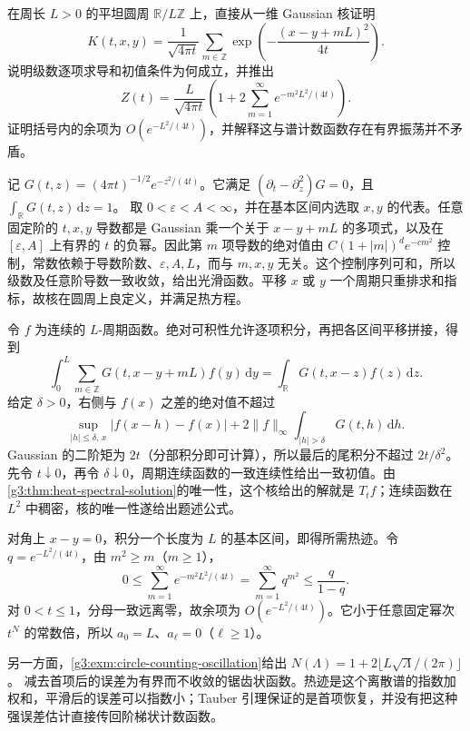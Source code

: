\begin{exercise}\label{g3:ex:circle-periodized-heat-trace}
	在周长 \(L>0\) 的平坦圆周 \(\mathbb R/L\mathbb Z\) 上，直接从一维 Gaussian 核证明
	\[
		K(t,x,y)=\frac1{\sqrt{4\pi t}}
		\sum_{m\in\mathbb Z}
		\exp\left(-\frac{(x-y+mL)^2}{4t}\right).
	\]
	说明级数逐项求导和初值条件为何成立，并推出
	\[
		Z(t)=\frac L{\sqrt{4\pi t}}
		\left(1+2\sum_{m=1}^{\infty}e^{-m^2L^2/(4t)}\right).
	\]
	证明括号内的余项为 \(O(e^{-L^2/(4t)})\)，并解释这与谱计数函数存在有界振荡并不矛盾。
\end{exercise}
\begin{solution}
	记 \(G(t,z)=(4\pi t)^{-1/2}e^{-z^2/(4t)}\)。它满足
	\((\partial_t-\partial_z^2)G=0\)，且
	\(\int_{\mathbb R}G(t,z)\,\mathrm dz=1\)。
	取 \(0<\varepsilon<A<\infty\)，并在基本区间内选取 \(x,y\) 的代表。任意固定阶的 \(t,x,y\) 导数都是 Gaussian 乘一个关于 \(x-y+mL\) 的多项式，以及在 \([\varepsilon,A]\) 上有界的 \(t\) 的负幂。因此第 \(m\) 项导数的绝对值由
	\(C(1+|m|)^d e^{-c m^2}\) 控制，常数依赖于导数阶数、\(\varepsilon,A,L\)，而与 \(m,x,y\) 无关。这个控制序列可和，所以级数及任意阶导数一致收敛，给出光滑函数。平移 \(x\) 或 \(y\) 一个周期只重排求和指标，故核在圆周上良定义，并满足热方程。

	令 \(f\) 为连续的 \(L\)-周期函数。绝对可积性允许逐项积分，再把各区间平移拼接，得到
	\[
		\int_0^L\sum_{m\in\mathbb Z}G(t,x-y+mL)f(y)\,\mathrm dy
		=\int_{\mathbb R}G(t,x-z)f(z)\,\mathrm dz.
	\]
	给定 \(\delta>0\)，右侧与 \(f(x)\) 之差的绝对值不超过
	\[
		\sup_{|h|\le\delta,\,x}|f(x-h)-f(x)|
		+2\lVert f\rVert_\infty
		\int_{|h|>\delta}G(t,h)\,\mathrm dh.
	\]
	Gaussian 的二阶矩为 \(2t\)（分部积分即可计算），所以最后的尾积分不超过 \(2t/\delta^2\)。先令 \(t\downarrow0\)，再令 \(\delta\downarrow0\)，周期连续函数的一致连续性给出一致初值。由\cref{g3:thm:heat-spectral-solution}的唯一性，这个核给出的解就是 \(T_tf\)；连续函数在 \(L^2\) 中稠密，核的唯一性遂给出题述公式。

	对角上 \(x-y=0\)，积分一个长度为 \(L\) 的基本区间，即得所需热迹。令 \(q=e^{-L^2/(4t)}\)，由 \(m^2\ge m\)（\(m\ge1\)），
	\[
		0\le\sum_{m=1}^\infty e^{-m^2L^2/(4t)}
		=\sum_{m=1}^\infty q^{m^2}
		\le\frac q{1-q}.
	\]
	对 \(0<t\le1\)，分母一致远离零，故余项为 \(O(e^{-L^2/(4t)})\)。它小于任意固定幂次 \(t^N\) 的常数倍，所以 \(a_0=L\)、\(a_\ell=0\)（\(\ell\ge1\)）。

	另一方面，\cref{g3:exm:circle-counting-oscillation}给出
	\(N(\Lambda)=1+2\lfloor L\sqrt\Lambda/(2\pi)\rfloor\)。
	减去首项后的误差为有界而不收敛的锯齿状函数。热迹是这个离散谱的指数加权和，平滑后的误差可以指数小；Tauber 引理保证的是首项恢复，并没有把这种强误差估计直接传回阶梯状计数函数。
\end{solution}

